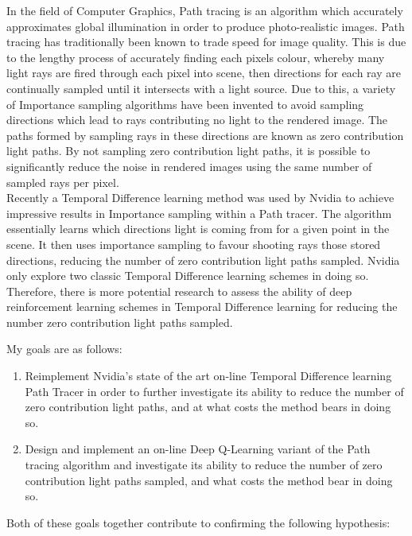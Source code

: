 \documentclass[ %
                    author={Callum Pearce},
                supervisor={Dr. Neill Campbell},
                    degree={MEng},
                     title={How effective are Temporal difference learning methods in reducing the number of zero contribution light paths in Path tracing?},
                  subtitle={},
                      type={research},
                      year={2019} ]{dissertation}
\begin{document}
In the field of Computer Graphics, Path tracing is an algorithm which 
accurately approximates global illumination in order to produce 
photo-realistic images. Path tracing has traditionally been known to 
trade speed for image quality. This is due to the lengthy process of accurately 
finding each pixels colour, whereby many light rays are 
fired through each pixel into scene, then directions for each ray are 
continually sampled until it intersects with a light source. Due to 
this, a variety of Importance sampling algorithms have been invented 
to avoid sampling directions which lead to rays contributing no light 
to the rendered image. The paths formed by sampling rays in these 
directions are known as zero contribution light paths. By not sampling 
zero contribution light paths, it is possible to significantly reduce 
the noise in rendered images using the same number of sampled rays per 
pixel.\\

Recently a Temporal Difference learning method was used by Nvidia to
achieve impressive results in Importance sampling within a Path tracer.
The algorithm essentially learns which directions light is coming from for
a given point in the scene. It then uses importance sampling to favour shooting
rays those stored directions, reducing the number of zero contribution light paths
sampled. Nvidia only explore two classic Temporal Difference learning schemes
in doing so. Therefore, there is more potential research to assess the 
ability of deep reinforcement learning schemes in Temporal Difference 
learning for reducing the number zero contribution light paths sampled.

\noindent
My goals are as follows:

\begin{enumerate}
\item Reimplement Nvidia's state of the art on-line Temporal 
Difference learning Path Tracer in order to further investigate its ability
to reduce the number of zero contribution light paths, and at what costs
the method bears in doing so. 

\item Design and implement an on-line Deep Q-Learning variant of the
Path tracing algorithm and investigate its ability to reduce the number of zero contribution light paths sampled, and what costs the method bear in doing so.

\end{enumerate}

\noindent
Both of these goals together contribute to confirming the following hypothesis:
\end{document}
